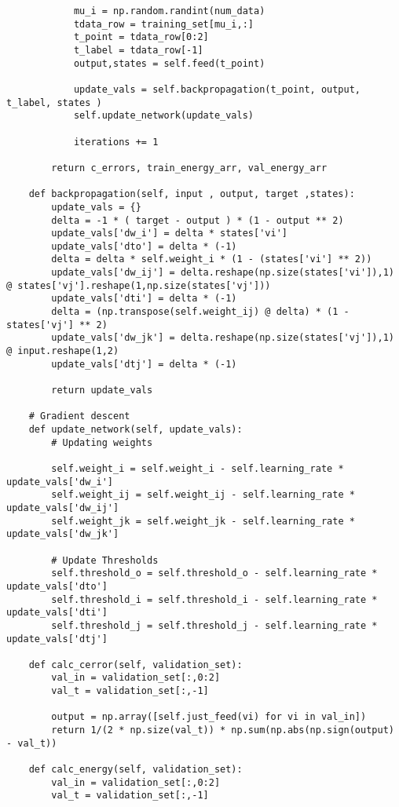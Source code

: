 \documentclass{article}
\begin{document}
\begin{verbatim}
            mu_i = np.random.randint(num_data)
            tdata_row = training_set[mu_i,:]
            t_point = tdata_row[0:2]
            t_label = tdata_row[-1]
            output,states = self.feed(t_point)

            update_vals = self.backpropagation(t_point, output, t_label, states )
            self.update_network(update_vals)

            iterations += 1
            
        return c_errors, train_energy_arr, val_energy_arr

    def backpropagation(self, input , output, target ,states):
        update_vals = {}
        delta = -1 * ( target - output ) * (1 - output ** 2)
        update_vals['dw_i'] = delta * states['vi']
        update_vals['dto'] = delta * (-1)
        delta = delta * self.weight_i * (1 - (states['vi'] ** 2))
        update_vals['dw_ij'] = delta.reshape(np.size(states['vi']),1) @ states['vj'].reshape(1,np.size(states['vj']))
        update_vals['dti'] = delta * (-1)
        delta = (np.transpose(self.weight_ij) @ delta) * (1 - states['vj'] ** 2)
        update_vals['dw_jk'] = delta.reshape(np.size(states['vj']),1) @ input.reshape(1,2)
        update_vals['dtj'] = delta * (-1)

        return update_vals

    # Gradient descent
    def update_network(self, update_vals):
        # Updating weights

        self.weight_i = self.weight_i - self.learning_rate * update_vals['dw_i']
        self.weight_ij = self.weight_ij - self.learning_rate * update_vals['dw_ij']
        self.weight_jk = self.weight_jk - self.learning_rate * update_vals['dw_jk']

        # Update Thresholds
        self.threshold_o = self.threshold_o - self.learning_rate * update_vals['dto']
        self.threshold_i = self.threshold_i - self.learning_rate * update_vals['dti']
        self.threshold_j = self.threshold_j - self.learning_rate * update_vals['dtj']
    
    def calc_cerror(self, validation_set):
        val_in = validation_set[:,0:2]
        val_t = validation_set[:,-1]

        output = np.array([self.just_feed(vi) for vi in val_in])
        return 1/(2 * np.size(val_t)) * np.sum(np.abs(np.sign(output) - val_t))

    def calc_energy(self, validation_set):
        val_in = validation_set[:,0:2]
        val_t = validation_set[:,-1]


\end{verbatim}
\end{document}
